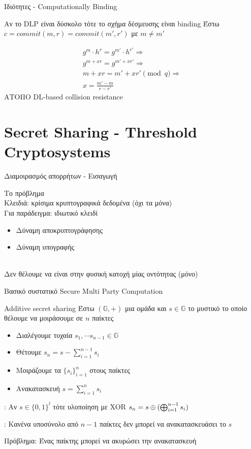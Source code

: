\documentclass[handout]{beamer}
\begin{document}
\begin{frame}{Ιδιότητες - Computationally Binding}

{Aν το DLP είναι δύσκολο τότε το σχήμα δέσμευσης είναι binding} \pause
Έστω $c=commit(m,r)=commit(m',r')$ με $m \neq m'$ \pause

\begin{align*}
g^m \cdot h^r = g^{m'} \cdot h^{r'} \Rightarrow \\
g^{m+xr} = g^{m' + xr'} \Rightarrow \\
m+xr=m'+xr' \pmod{q} \Rightarrow \\
x = \frac{m'-m}{r-r'}
\end{align*}
\pause
\alert{ΑΤΟΠΟ}
\pause 
DL-based collision resistance
\end{frame}

\section{Secret Sharing - Threshold Cryptosystems}
\begin{frame}{Διαμοιρασμός απορρήτων - Εισαγωγή}

  \alert{Το πρόβλημα}\\
Κλειδιά: κρίσιμα κρυπτογραφικά δεδομένα (όχι τα μόνα)\\
\medskip
\pause
Για παράδειγμα: ιδιωτικό κλειδί
\begin{itemize}
\item Δύναμη αποκρυπτογράφησης
\item Δύναμη υπογραφής
\end{itemize}
\medskip
\pause
{}\\
Δεν θέλουμε να είναι στην φυσική κατοχή μίας οντότητας (μόνο)

Βασικό συστατικό Secure Multi Party Computation
\end{frame}

\begin{frame}{Additive secret sharing}
Έστω $(\mathbb{G},+)$ μια ομάδα και $s \in \mathbb{G}$ το μυστικό το οποίο θέλουμε να μοιράσουμε σε $n$ παίκτες

\begin{itemize}

\pause
\item Διαλέγουμε τυχαία $s_1, \cdots s_{n-1} \in \mathbb{G}$

\pause
\item Θέτουμε $s_n = s - \sum_{i=1}^{n-1} s_i$

\pause
\item Μοιράζουμε τα $\{ s_i \}_{i=1}^n$ στους παίκτες

\pause
\item Ανακατασκευή $s = \sum_{i=1}^n s_i$
\end{itemize}

\pause
{}: Αν $s \in \{0,1\}^l$ τότε υλοποίηση με XOR \pause $s_n = s \oplus (\bigoplus_{i=1}^{n-1} s_i)$

\pause
{}: Κανένα υποσύνολο	από $n-1$ παίκτες δεν μπορεί να ανακατασκευάσει το $s$
\pause

\alert{Πρόβλημα:} Ένας παίκτης μπορεί να ακυρώσει την ανακατασκευή 
\end{frame}
\end{document}
